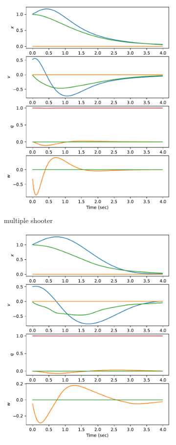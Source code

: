 \documentclass[]{article}
\begin{document}
\begin{figure}[H]
\begin{subfigure}[b]{0.3\textwidth}
		\includegraphics[width=\textwidth]{figures/statex1z1vx3.pdf}
		\caption{multiple shooter}
	\end{subfigure}
	\begin{subfigure}[b]{0.3\textwidth}
		\centering
		\includegraphics[width=\textwidth]{figures/statex1z1vx2.pdf}

\end{subfigure}
\end{figure}
\end{document}
